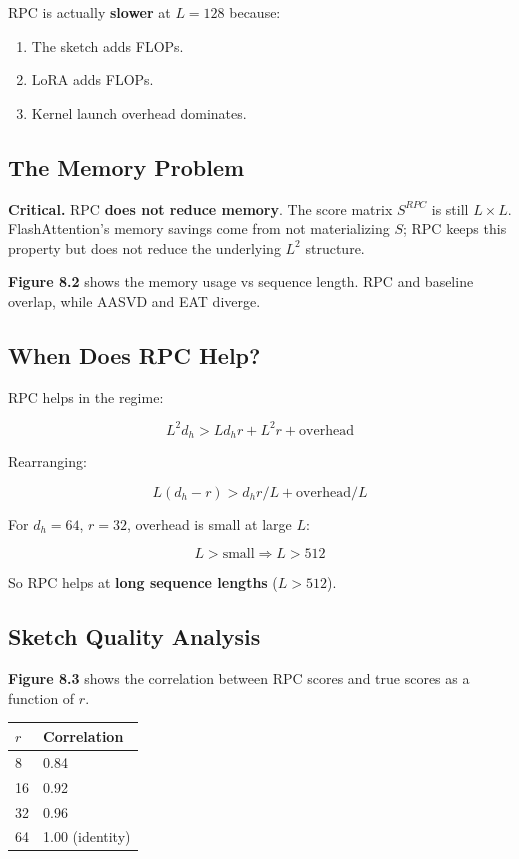 RPC is actually \textbf{slower} at $L = 128$ because:
\begin{enumerate}
\item The sketch adds FLOPs.
\item LoRA adds FLOPs.
\item Kernel launch overhead dominates.

\end{enumerate}
\subsection{The Memory Problem}

\textbf{Critical.} RPC \textbf{does not reduce memory}. The score matrix 
$S^{RPC}$ is still $L \times L$. FlashAttention's memory savings come from 
not materializing $S$; RPC keeps this property but does not reduce the 
underlying $L^2$ structure.

\textbf{Figure 8.2} shows the memory usage vs sequence length. RPC and baseline 
overlap, while AASVD and EAT diverge.

\subsection{When Does RPC Help?}

RPC helps in the regime:

\[
L^2 d_h > L d_h r + L^2 r + \text{overhead}
\tag{8.1}
\]

Rearranging:

\[
L (d_h - r) > d_h r / L + \text{overhead} / L
\tag{8.2}
\]

For $d_h = 64$, $r = 32$, overhead is small at large $L$:

\[
L > \text{small} \Rightarrow L > 512
\]

So RPC helps at \textbf{long sequence lengths} ($L > 512$).

\subsection{Sketch Quality Analysis}

\textbf{Figure 8.3} shows the correlation between RPC scores and true scores as 
a function of $r$.

\begin{table}[H]
\centering
\small
\begin{tabular}{ll}
\toprule
\textbf{$r$} & \textbf{Correlation} \\
\midrule
8 & 0.84 \\
16 & 0.92 \\
32 & 0.96 \\
64 & 1.00 (identity) \\
\bottomrule
\end{tabular}
\end{table}

